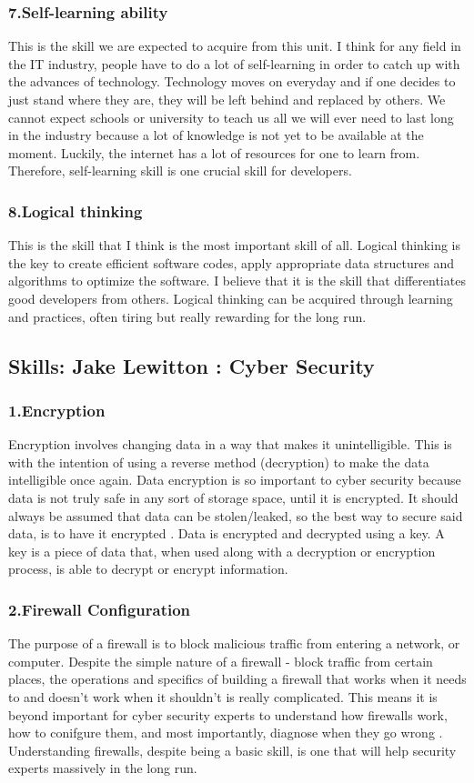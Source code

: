 \documentclass[a4paper, 11pt]{report}
\begin{document}
	\subsubsection{7.Self-learning ability}
	 This is the skill we are expected to acquire from this unit. I think for any field in the IT industry, people have to do a lot of self-learning in order to catch up with the advances of technology. Technology moves on everyday and if one decides to just stand where they are, they will be left behind and replaced by others. We cannot expect schools or university to teach us all we will ever need to last long in the industry  because a lot of knowledge is not yet to be available at the moment. Luckily, the internet has a lot of resources for one to learn from. Therefore, self-learning skill is one crucial skill for developers.
	\subsubsection{8.Logical thinking}
	 This is the skill that I think is the most important skill of all. Logical thinking is the key to create efficient software codes, apply appropriate data structures and algorithms to  optimize the software. I believe that it is the skill that differentiates good developers from others. Logical thinking can be acquired through learning and practices, often tiring but really rewarding for the long run. 

\subsection{Skills: Jake Lewitton : Cyber Security}
    \subsubsection{1.Encryption}
    Encryption involves changing data in a way that makes it unintelligible. This is with the intention of using a reverse method (decryption) to make the data intelligible once again. Data encryption is so important to cyber security because data is not truly safe in any sort of storage space, until it is encrypted. It should always be assumed that data can be stolen/leaked, so the best way to secure said data, is to have it encrypted \cite{jake1}. Data is encrypted and decrypted using a key. A key is a piece of data that, when used along with a decryption or encryption process, is able to decrypt or encrypt information.
    \subsubsection{2.Firewall Configuration}
    The purpose of a firewall is to block malicious traffic from entering a network, or computer. Despite the simple nature of a firewall - block traffic from certain places, the operations and specifics of building a firewall that works when it needs to and doesn't work when it shouldn't is really complicated. This means it is beyond important for cyber security experts to understand how firewalls work, how to conifgure them, and most importantly, diagnose when they go wrong \cite{jake2}. Understanding firewalls, despite being a basic skill, is one that will help security experts massively in the long run.
\end{document}
